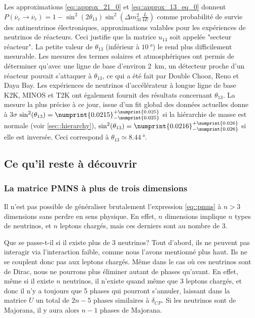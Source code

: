 		    Les approximations \eqref{eq::approx_21_0} et \eqref{eq::approx_13_eq_0} donnent $P(\overline{\nu}_e\to\overline{\nu}_e) = 1-\sin^2(2\theta_{13})\sin^2\left(\Delta m^2_{31}\frac{L}{4E}\right)$ comme probabilité de survie des antineutrinos électroniques, approximations valables pour les expériences de neutrinos de réacteurs. Ceci justifie que la matrice $u_{13}$ soit appelée "secteur réacteur". La petite valeur de $\theta_{13}$ (inférieur à $\SI{10}{\degree}$) le rend plus difficilement mesurable. Les mesures des termes solaires et atmosphériques ont permis de déterminer qu'avec une ligne de base d'environ \SI{2}{\kilo\meter}, un détecteur proche d'un réacteur pouvait s'attaquer à $\theta_{13}$, ce qui a été fait par Double Chooz\cite{Crespo-Anadon2014}, Reno\cite{Collaboration2010} et Daya Bay\cite{An2014}. Les expériences de neutrinos d'accélérateur à longue ligne de base K2K\cite{Collaboration2006a}, MINOS\cite{Collaboration2014} et T2K\cite{Abe2018} ont également fournit des résultats concernant $\theta_{13}$. La mesure la plus précise à ce jour, issue d'un fit global des données actuelles donne à $3\sigma$ $\sin^2(\theta_{13})=\numprint{0.0215}^{+\numprint{0.025}}_{-\numprint{0.025}}$\cite{pdg2018} si la hiérarchie de masse est normale (voir \autoref{sec::hierarchy}), $\sin^2(\theta_{13})=\numprint{0.0216}^{+\numprint{0.026}}_{-\numprint{0.026}}$ si elle est inversée. Ceci correspond à $\theta_{13}\simeq\SI{8.44}{\degree}$.
		    
		    \subsection{Ce qu'il reste à découvrir}
		    
		        \subsubsection{La matrice PMNS à plus de trois dimensions}
		        
	            Il n'est pas possible de généraliser brutalement l'expression \eqref{eq::pmns} à $n>3$ dimensions sans perdre en sens physique. En effet, $n$ dimensions implique $n$ types de neutrinos, et $n$ leptons chargés, mais ces derniers sont au nombre de 3.
	            
	            Que se passe-t-il si il existe plus de 3 neutrinos? Tout d'abord, ils ne peuvent pas interagir via l'interaction faible, comme nous l'avons mentionné plus haut. Ils ne se couplent donc pas aux leptons chargés. Même dans le cas où ces neutrinos sont de Dirac, nous ne pourrons plus éliminer autant de phases qu'avant. En effet, même si il existe $n$ neutrinos, il n'existe quand même que 3 leptons chargés, et donc il n'y a toujours que 5 phases qui pourront s'annuler, laissant dans la matrice $U$ un total de $2n-5$ phases similaires à $\delta_{CP}$. Si les neutrinos sont de Majorana, il y aura alors $n-1$ phases de Majorana.
	            
